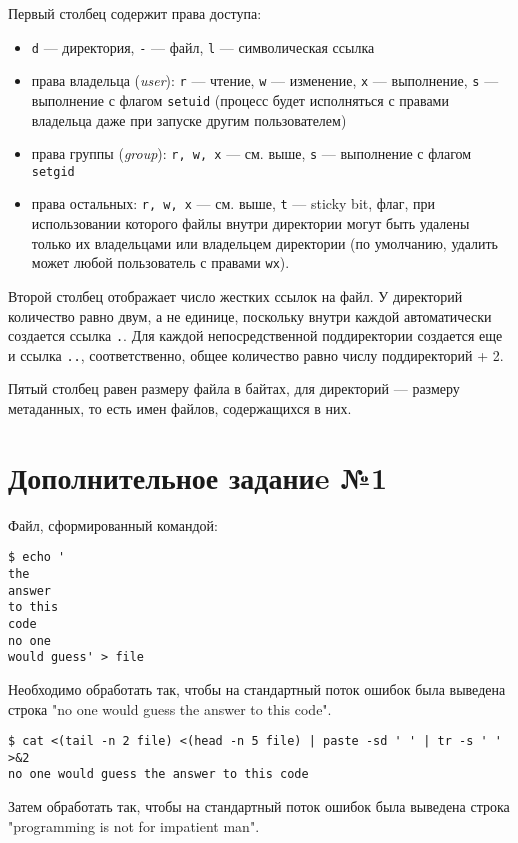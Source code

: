 \documentclass[listings]{labreport}
\begin{document}
Первый столбец содержит права доступа:
\begin{itemize}
\item \texttt{d} — директория, \texttt{-} — файл, \texttt{l} — символическая ссылка
\item права владельца (\textit{user}): \texttt{r} — чтение, \texttt{w} — изменение, \texttt{x} — выполнение,
  \texttt{s} — выполнение с флагом \texttt{setuid} (процесс будет исполняться с правами владельца даже при запуске другим пользователем)
\item права группы (\textit{group}): \texttt{r, w, x} — см. выше, \texttt{s} — выполнение с флагом \texttt{setgid}
\item права остальных: \texttt{r, w, x} — см. выше, \texttt{t} — sticky bit, флаг, при использовании которого файлы внутри директории
  могут быть удалены только их владельцами или владельцем директории (по умолчанию, удалить может любой пользователь с правами \texttt{wx}).
\end{itemize}

Второй столбец отображает число жестких ссылок на файл. У директорий количество равно двум, а не единице, поскольку внутри
каждой автоматически создается ссылка \texttt{.}. Для каждой непосредственной поддиректории создается еще и ссылка \texttt{..},
соответственно, общее количество равно числу поддиректорий + 2.

Пятый столбец равен размеру файла в байтах, для директорий — размеру метаданных, то есть имен файлов, содержащихся в них.

\section*{Дополнительное заданиe №1}

Файл, сформированный командой:
\begin{verbatim}
$ echo '
the
answer
to this
code
no one
would guess' > file
\end{verbatim}

Необходимо обработать так, чтобы на стандартный поток ошибок была выведена строка "no one would guess the answer to this code".

\begin{verbatim}
$ cat <(tail -n 2 file) <(head -n 5 file) | paste -sd ' ' | tr -s ' ' >&2
no one would guess the answer to this code
\end{verbatim}

Затем обработать так, чтобы на стандартный поток ошибок была выведена строка "programming is not for impatient man".
\end{document}
